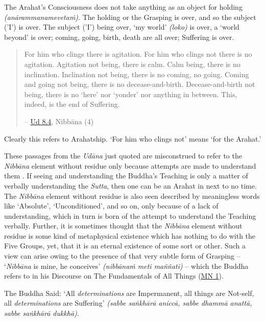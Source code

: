 The Arahat's Consciousness does not take anything as an object for holding \emph{(anārammanamevetaṁ)}. The holding or the Grasping is over, and so the subject ('I') is over. The subject ('I') being over, `my world' \emph{(loko)} is over, a `world beyond' is over; coming, going, birth, death are all over; Suffering is over.

\begin{quote}
For him who clings there is agitation. For him who clings not there is no agitation. Agitation not being, there is calm. Calm being, there is no inclination. Inclination not being, there is no coming, no going. Coming and going not being, there is no decease-and-birth. Decease-and-birth not being, there is no `here' nor `yonder' nor anything in between. This, indeed, is the end of Suffering.

 -- \href{https://suttacentral.net/ud8.4/en/anandajoti}{Ud 8.4}, Nibbāna (4)
\end{quote}

Clearly this refers to Arahatship. `For him who clings not' means `for the Arahat.'

These passages from the \emph{Udāna} just quoted are misconstrued to refer to the \emph{Nibbāna} element without residue only because attempts are made to understand them . If seeing and understanding the Buddha's Teaching is only a matter of verbally understanding the \emph{Sutta}, then one can be an Arahat in next to no time. The \emph{Nibbāna} element without residue is also seen described by meaningless words like `Absolute', `Unconditioned', and so on, only because of a lack of understanding, which in turn is born of the attempt to understand the Teaching verbally. Further, it is sometimes thought that the \emph{Nibbāna} element without residue is some kind of metaphysical existence which has nothing to do with the Five Groups, yet, that it is an eternal existence of some sort or other. Such a view can arise owing to the presence of that very subtle form of Grasping -- `\emph{Nibbāna} is mine, he conceives' \emph{(nibbānaṁ meti maññati)} -- which the Buddha refers to in his Discourse on The Fundamentals of All Things (\href{https://suttacentral.net/mn1/en/bodhi}{MN 1}).

\sectionBreak

The Buddha Said: `All \emph{determinations} are Impermanent, all things are Not-self, all \emph{determinations} are Suffering' \emph{(sabbe saṅkhārā aniccā, sabbe dhammā anattā, sabbe saṅkhārā dukkhā)}.

